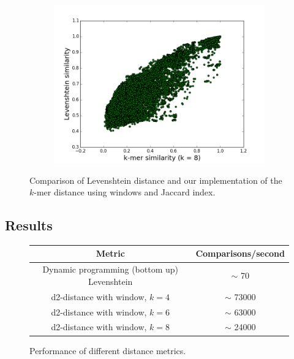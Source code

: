 \begin{figure}
	\centering
        \begin{subfigure}[b]{0.5\textwidth}
				\includegraphics[scale=0.34]{graphics/k8.png}
               	\label{fig:k8}
        \end{subfigure}
\caption{Comparison of Levenshtein distance and our implementation of the $k$-mer distance using windows and Jaccard index.}
\end{figure}

\subsection{Results}
\begin{figure}[H]
\begin{tabular}{ c | c }
  Metric                                        & Comparisons/second      \\
  \hline \hline
  Dynamic programming (bottom up) Levenshtein   & $\sim$ 70               \\
  \hline
  d2-distance with window, $k=4$                & $\sim$ 73000            \\
  \hline
  d2-distance with window, $k=6$                & $\sim$ 63000            \\
  \hline
  d2-distance with window, $k=8$                & $\sim$ 24000            \\
\end{tabular}
\caption{Performance of different distance metrics.}
\end{figure}

